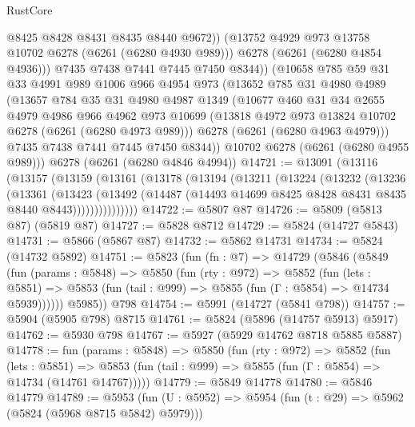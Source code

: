 \begin{lexlean}{RustCore}
\begin{coremodule}
              @8425
              @8428
              @8431
              @8435
              @8440
              @9672))
          (@13752 @4929 @973 @13758 @10702 @6278 (@6261 (@6280 @4930 @989)))
          @6278
          (@6261 (@6280 @4854 @4936)))
        @7435
        @7438
        @7441
        @7445
        @7450
        @8344))
    (@10658
      @785
      @59
      @31
      @33
      @4991
      @989
      @1006
      @966
      @4954
      @973
      (@13652
        @785
        @31
        @4980
        @4989
        (@13657
          @784
          @35
          @31
          @4980
          @4987
          @1349
          (@10677
            @460
            @31
            @34
            @2655
            @4979
            @4986
            @966
            @4962
            @973
            @10699
            (@13818 @4972 @973 @13824 @10702 @6278 (@6261 (@6280 @4973 @989)))
            @6278
            (@6261 (@6280 @4963 @4979)))
          @7435
          @7438
          @7441
          @7445
          @7450
          @8344))
      @10702
      @6278
      (@6261 (@6280 @4955 @989)))
    @6278
    (@6261 (@6280 @4846 @4994))
@14721 := @13091
    (@13116
      (@13157
        (@13159
          (@13161
            (@13178
              (@13194
                (@13211
                  (@13224
                    (@13232
                      (@13236
                        (@13361
                          (@13423
                            (@13492
                              (@14487
                                (@14493 @14699 @8425 @8428 @8431 @8435 @8440 @8443)))))))))))))))
@14722 := @5807 @87
@14726 := @5809 (@5813 @87) (@5819 @87)
@14727 := @5828 @8712
@14729 := @5824 (@14727 @5843)
@14731 := @5866 (@5867 @87)
@14732 := @5862 @14731
@14734 := @5824 (@14732 @5892)
@14751 := @5823
    (fun (fn : @7) =>
    @14729
      (@5846
        (@5849
          (fun (params : @5848) =>
          @5850
            (fun (rty : @972) =>
            @5852
              (fun (lets : @5851) =>
              @5853 (fun (tail : @999) => @5855 (fun (Γ : @5854) => @14734 @5939))))))
        @5985))
    @798
@14754 := @5991 (@14727 (@5841 @798))
@14757 := @5904 (@5905 @798) @8715
@14761 := @5824 (@5896 (@14757 @5913) @5917)
@14762 := @5930 @798
@14767 := @5927 (@5929 @14762 @8718 @5885 @5887)
@14778 := fun (params : @5848) =>
  @5850
    (fun (rty : @972) =>
    @5852
      (fun (lets : @5851) =>
      @5853 (fun (tail : @999) => @5855 (fun (Γ : @5854) => @14734 (@14761 @14767)))))
@14779 := @5849 @14778
@14780 := @5846 @14779
@14789 := @5953
    (fun (U : @5952) => @5954 (fun (t : @29) => @5962 (@5824 (@5968 @8715 @5842) @5979)))

\end{coremodule}
\end{lexlean}
